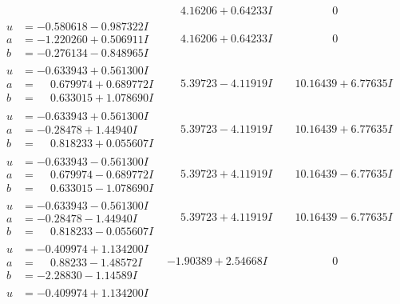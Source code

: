 \documentclass[1p]{elsarticle_modified}
\theoremstyle{definition}
\begin{document}
$$\begin{array}{c|c|c}
 & \phantom{-}4.16206 + 0.64233 I & \phantom{-0.000000 } 0 \\ \hline\begin{aligned}
u &= -0.580618 - 0.987322 I \\
a &= -1.220260 + 0.506911 I \\
b &= -0.276134 - 0.848965 I\end{aligned}
 & \phantom{-}4.16206 + 0.64233 I & \phantom{-0.000000 } 0 \\ \hline\begin{aligned}
u &= -0.633943 + 0.561300 I \\
a &= \phantom{-}0.679974 + 0.689772 I \\
b &= \phantom{-}0.633015 + 1.078690 I\end{aligned}
 & \phantom{-}5.39723 - 4.11919 I & \phantom{-}10.16439 + 6.77635 I \\ \hline\begin{aligned}
u &= -0.633943 + 0.561300 I \\
a &= -0.28478 + 1.44940 I \\
b &= \phantom{-}0.818233 + 0.055607 I\end{aligned}
 & \phantom{-}5.39723 - 4.11919 I & \phantom{-}10.16439 + 6.77635 I \\ \hline\begin{aligned}
u &= -0.633943 - 0.561300 I \\
a &= \phantom{-}0.679974 - 0.689772 I \\
b &= \phantom{-}0.633015 - 1.078690 I\end{aligned}
 & \phantom{-}5.39723 + 4.11919 I & \phantom{-}10.16439 - 6.77635 I \\ \hline\begin{aligned}
u &= -0.633943 - 0.561300 I \\
a &= -0.28478 - 1.44940 I \\
b &= \phantom{-}0.818233 - 0.055607 I\end{aligned}
 & \phantom{-}5.39723 + 4.11919 I & \phantom{-}10.16439 - 6.77635 I \\ \hline\begin{aligned}
u &= -0.409974 + 1.134200 I \\
a &= \phantom{-}0.88233 - 1.48572 I \\
b &= -2.28830 - 1.14589 I\end{aligned}
 & -1.90389 + 2.54668 I & \phantom{-0.000000 } 0 \\ \hline\begin{aligned}
u &= -0.409974 + 1.134200 I \\

\end{aligned}
\end{array}$$
\end{document}
